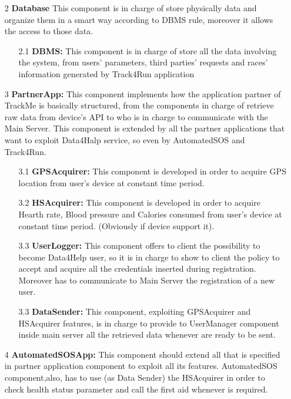 \begin{enumerate}
\begin{enumerate}
	\end{enumerate}
	
\item [2] \textbf{Database} 
This component is in charge of store physically data and organize them in a smart way according to DBMS rule, moreover it allows the access to those data.

	\begin{enumerate}
	\item [2.1]\textbf{DBMS: }
	This component is in charge of store all the data involving the system, from users' parameters, third parties' requests and races' information generated by Track4Run application
	\end{enumerate}
	
\item [3]\textbf{PartnerApp: }
This component implements how the application partner of TrackMe is basically structured, from the components in charge of retrieve raw data from device's API to who is in charge to communicate with the Main Server. This component is extended by all the partner applications that want to exploit Data4Halp service, so even by AutomatedSOS and Track4Run.

	\begin{enumerate}
	\item [3.1]\textbf{GPSAcquirer:}
	This component is developed in order to acquire GPS location from user's device at constant time period.
	
	\item [3.2]\textbf{HSAcquirer:}
	This component is developed in order to acquire Hearth rate, Blood pressure and Calories consumed from user's device at constant time period. (Obviously if device support it). 
	
	\item [3.3]\textbf{UserLogger:}
	 This component offers to client the possibility to become Data4Help user, so it is in charge to show to client the policy to accept and acquire all the credentials inserted during registration. Moreover has to communicate to Main Server the registration of a new user.
	 
	\item [3.3]\textbf{DataSender:}
	This component, exploiting GPSAcquirer and HSAcquirer features, is in charge to provide to UserManager component inside main server all the retrieved data whenever are ready to be sent.
	\end{enumerate}

\item [4]\textbf{AutomatedSOSApp: }
This component should extend all that is specified in partner application component to exploit all its features. AutomatedSOS component,also, has to use (as Data Sender) the HSAcquirer in order to check health status parameter and call the first aid whenever is required.


\end{enumerate}
